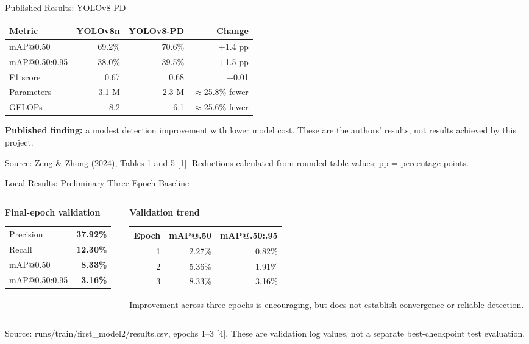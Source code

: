 \documentclass[aspectratio=169,11pt]{beamer}
\newcommand{\source}[1]{\par\vfill{\fontsize{7}{9}\selectfont\color{muted}Source: #1\par}}
\newcommand{\lead}[1]{{\large\bfseries\color{teal}#1}\par\medskip}
\begin{document}
\begin{frame}{Published Results: YOLOv8-PD}
\centering\renewcommand{\arraystretch}{1.55}
\begin{tabular}{lrrr}\toprule
\textbf{Metric}&\textbf{YOLOv8n}&\textbf{YOLOv8-PD}&\textbf{Change}\\\midrule
mAP@0.50&69.2\%&70.6\%&+1.4 pp\\
mAP@0.50:0.95&38.0\%&39.5\%&+1.5 pp\\
F1 score&0.67&0.68&+0.01\\
Parameters&3.1 M&2.3 M&$\approx$25.8\% fewer\\
GFLOPs&8.2&6.1&$\approx$25.6\% fewer\\\bottomrule
\end{tabular}
\par\bigskip\raggedright
\textbf{Published finding:} a modest detection improvement with lower model cost. These are the authors' results, not results achieved by this project.
\source{Zeng \& Zhong (2024), Tables 1 and 5 [1]. Reductions calculated from rounded table values; pp = percentage points.}
\end{frame}

\begin{frame}{Local Results: Preliminary Three-Epoch Baseline}
\begin{columns}[T]
\begin{column}{.46\textwidth}
\lead{Final-epoch validation}
\renewcommand{\arraystretch}{1.55}
\begin{tabular}{lr}\toprule
Precision&\textbf{37.92\%}\\
Recall&\textbf{12.30\%}\\
mAP@0.50&\textbf{8.33\%}\\
mAP@0.50:0.95&\textbf{3.16\%}\\\bottomrule
\end{tabular}
\end{column}
\begin{column}{.49\textwidth}
\lead{Validation trend}
\small\renewcommand{\arraystretch}{1.55}
\begin{tabular}{rrr}\toprule
\textbf{Epoch}&\textbf{mAP@.50}&\textbf{mAP@.50:.95}\\\midrule
1&2.27\%&0.82\%\\
2&5.36\%&1.91\%\\
3&8.33\%&3.16\%\\\bottomrule
\end{tabular}
\medskip\par
Improvement across three epochs is encouraging, but does not establish convergence or reliable detection.
\end{column}
\end{columns}
\source{runs/train/first\_model2/results.csv, epochs 1--3 [4]. These are validation log values, not a separate best-checkpoint test evaluation.}
\end{frame}
\end{document}
